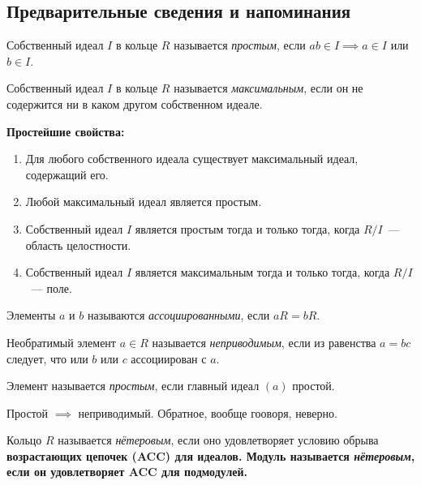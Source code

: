 
\subsection{Предварительные сведения и напоминания}

\begin{definition}
	Собственный идеал $I$ в кольце $R$ называется \emph{простым}, если $ab \in I \implies a \in I$ или $b \in I$.

	Собственный идеал $I$ в кольце $R$ называется \emph{максимальным}, если он не содержится ни в каком другом собственном идеале.
\end{definition}

\noindent\bf{Простейшие свойства:}

\begin{enumerate}
	\item Для любого собственного идеала существует максимальный идеал, содержащий его. 

	\item Любой максимальный идеал является простым. 

	\item Собственный идеал $I$ является простым тогда и только тогда, когда $R/I$~--- область целостности. 

	\item Собственный идеал $I$ является максимальным тогда и только тогда, когда $R/I$~--- поле. 
\end{enumerate}

\begin{definition} 
	Элементы $a$ и $b$ называются \emph{ассоциированными}, если $aR = bR$.

	Необратимый элемент $a \in R$ называется \emph{неприводимым}, если из равенства $a = bc$ следует, что или $b$ или $c$ ассоциирован с $a$.

	Элемент называется \emph{простым}, если главный идеал $(a)$  простой. 
\end{definition}

\begin{remark}
	Простой $\implies$ неприводимый. Обратное, вообще гооворя, неверно. 
\end{remark}

\begin{definition} 
	Кольцо $R$ называется \emph{нётеровым}, если оно удовлетворяет условию обрыва \bf{возрастающих} цепочек (ACC) для идеалов. 
	Модуль называется \emph{нётеровым}, если он удовлетворяет ACC для подмодулей. 
\end{definition}

